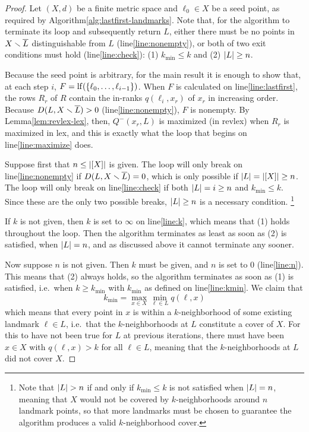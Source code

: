 \documentclass{article}
\begin{document}
\begin{proof}
Let $(X,d)$ be a finite metric space and $\ell_0 \in X$ be a seed point, as required by Algorithm\nbs\ref{alg:lastfirst-landmarks}.
Note that, for the algorithm to terminate its loop and subsequently return $L$, either there must be no points in $X \smallsetminus \overline{L}$ distinguishable from $L$ (line\nbs\ref{line:nonempty}), or both of two exit conditions must hold (line\nbs\ref{line:check}):
  (1) $k_{\min} \leq k$ and
  (2) $\lvert L\rvert \geq n$.

Because the seed point is arbitrary, for the main result it is enough to show that, at each step $i$, $F = \operatorname{lf}(\{ \ell_0, \ldots, \ell_{i-1} \})$.
When $F$ is calculated on line\nbs\ref{line:lastfirst}, the rows $R_r$ of $R$ contain the in-ranks $q(\ell_i, x_r)$ of $x_r$ in increasing order.
Because $D(L, X \smallsetminus \overline{L}) > 0$ (line\nbs\ref{line:nonempty}), $F$ is nonempty.
By Lemma\nbs\ref{lem:revlex-lex}, then, $Q^-(x_r, L)$ is maximized (in revlex) when $R_r$ is maximized in lex, and this is exactly what the loop that begins on line\nbs\ref{line:maximize} does.

Suppose first that $n \leq \lvert [X]\rvert$ is given.
The loop will only break on line\nbs\ref{line:nonempty} if $D(L, X \smallsetminus \overline{L}) = 0$, which is only possible if $\lvert L\rvert = \lvert [X]\rvert \geq n$.
The loop will only break on line\nbs\ref{line:check} if both $\lvert L\rvert = i \geq n$ and $k_{\min} \leq k$.
Since these are the only two possible breaks, $\lvert L\rvert \geq n$ is a necessary condition.
\footnote{Note that $\lvert L\rvert > n$ if and only if $k_{\min} \leq k$ is not satisfied when $\lvert L\rvert = n$, meaning that $X$ would not be covered by $k$-neighborhoods around $n$ landmark points, so that more landmarks must be chosen to guarantee the algorithm produces a valid $k$-neighborhood cover.}

If $k$ is not given, then $k$ is set to $\infty$ on line\nbs\ref{line:k}, which means that (1) holds throughout the loop.
Then the algorithm terminates as least as soon as (2) is satisfied, when $\lvert L\rvert = n$, and as discussed above it cannot terminate any sooner.

Now suppose $n$ is not given.
Then $k$ must be given, and $n$ is set to $0$ (line\nbs\ref{line:n}).
This means that (2) always holds, so the algorithm terminates as soon as (1) is satisfied, i.e.\ when $k \geq k_{\min}$ with $k_{\min}$ as defined on line\nbs\ref{line:kmin}.
We claim that
\[ k_{\min} = \max_{x \in X}{ \min_{\ell \in L}{ q(\ell, x) } } \]
which means that every point in $x$ is within a $k$-neighborhood of some existing landmark $\ell \in L$, i.e.\ that the $k$-neighborhoods at $L$ constitute a cover of $X$.
For this to have not been true for $L$ at previous iterations, there must have been $x \in X$ with $q(\ell, x) > k$ for all $\ell \in L$, meaning that the $k$-neighborhoods at $L$ did not cover $X$.


\end{proof}
\end{document}
